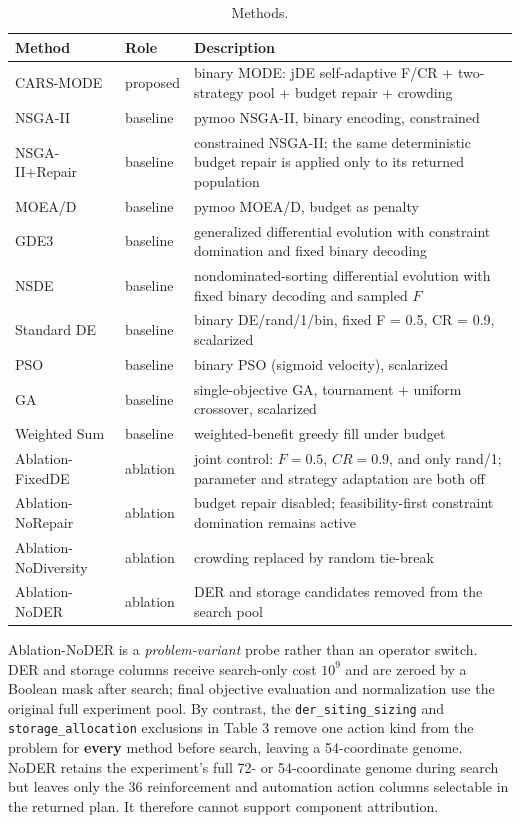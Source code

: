 \documentclass[energies,article,submit,moreauthors]{Definitions/mdpi}
\begin{document}
\begin{table}[t]
\centering
\scriptsize
\setlength{\tabcolsep}{3pt}
\caption{Methods.}\label{tab:4}
\begin{tabularx}{\textwidth}{@{}>{\raggedright\arraybackslash}X >{\raggedright\arraybackslash}X >{\raggedright\arraybackslash}X@{}}
\toprule
Method & Role & Description \\
\midrule
CARS-MODE & proposed & binary MODE: jDE self-adaptive F/CR + two-strategy pool + budget repair + crowding \\
NSGA-II & baseline & pymoo NSGA-II, binary encoding, constrained \\
NSGA-II+Repair & baseline & constrained NSGA-II; the same deterministic budget repair is applied only to its returned population \\
MOEA/D & baseline & pymoo MOEA/D, budget as penalty \\
GDE3 & baseline & generalized differential evolution with constraint domination and fixed binary decoding \\
NSDE & baseline & nondominated-sorting differential evolution with fixed binary decoding and sampled $F$ \\
Standard DE & baseline & binary DE/rand/1/bin, fixed F = 0.5, CR = 0.9, scalarized \\
PSO & baseline & binary PSO (sigmoid velocity), scalarized \\
GA & baseline & single-objective GA, tournament + uniform crossover, scalarized \\
Weighted Sum & baseline & weighted-benefit greedy fill under budget \\
Ablation-FixedDE & ablation & joint control: $F = 0.5$, $CR = 0.9$, and only rand/1; parameter and strategy adaptation are both off \\
Ablation-NoRepair & ablation & budget repair disabled; feasibility-first constraint domination remains active \\
Ablation-NoDiversity & ablation & crowding replaced by random tie-break \\
Ablation-NoDER & ablation & DER and storage candidates removed from the search pool \\
\bottomrule
\end{tabularx}
\end{table}

Ablation-NoDER is a \emph{problem-variant} probe rather than an operator switch. DER and storage columns receive search-only cost \(10^9\) and are zeroed by a Boolean mask after search; final objective evaluation and normalization use the original full experiment pool. By contrast, the \texttt{der\_siting\_sizing} and \texttt{storage\_allocation} exclusions in Table 3 remove one action kind from the problem for \textbf{every} method before search, leaving a 54-coordinate genome. NoDER retains the experiment's full 72- or 54-coordinate genome during search but leaves only the 36 reinforcement and automation action columns selectable in the returned plan. It therefore cannot support component attribution.
\end{document}
